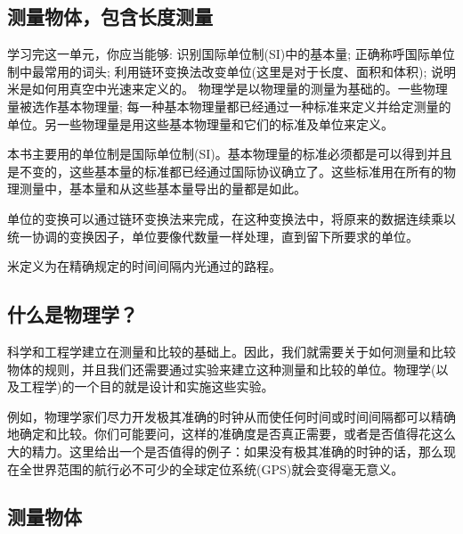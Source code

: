 \begin{Project}

\section{测量物体，包含长度测量}

\begin{Point*}
	学习完这一单元，你应当能够: 识别国际单位制(SI)中的基本量; 正确称呼国际单位制中最常用的词头; 利用链环变换法改变单位(这里是对于长度、面积和体积); 说明米是如何用真空中光速来定义的。
	\tcblower
	物理学是以物理量的测量为基础的。一些物理量被选作基本物理量; 每一种基本物理量都已经通过一种标准来定义并给定测量的单位。另一些物理量是用这些基本物理量和它们的标准及单位来定义。
	
	本书主要用的单位制是国际单位制(SI)。基本物理量的标准必须都是可以得到并且是不变的，这些基本量的标准都已经通过国际协议确立了。这些标准用在所有的物理测量中，基本量和从这些基本量导出的量都是如此。
	
	单位的变换可以通过链环变换法来完成，在这种变换法中，将原来的数据连续乘以统一协调的变换因子，单位要像代数量一样处理，直到留下所要求的单位。

	米定义为在精确规定的时间间隔内光通过的路程。
\end{Point*}


%



\begin{Paracol}
	\subsection{什么是物理学？}
	
	科学和工程学建立在测量和比较的基础上。因此，我们就需要关于如何测量和比较物体的规则，并且我们还需要通过实验来建立这种测量和比较的单位。物理学(以及工程学)的一个目的就是设计和实施这些实验。
	
	例如，物理学家们尽力开发极其准确的时钟从而使任何时间或时间间隔都可以精确地确定和比较。你们可能要问，这样的准确度是否真正需要，或者是否值得花这么大的精力。这里给出一个是否值得的例子：如果没有极其准确的时钟的话，那么现在全世界范围的航行必不可少的全球定位系统(GPS)就会变得毫无意义。
	
	\subsection{测量物体}
	

\end{Paracol}
\end{Project}
